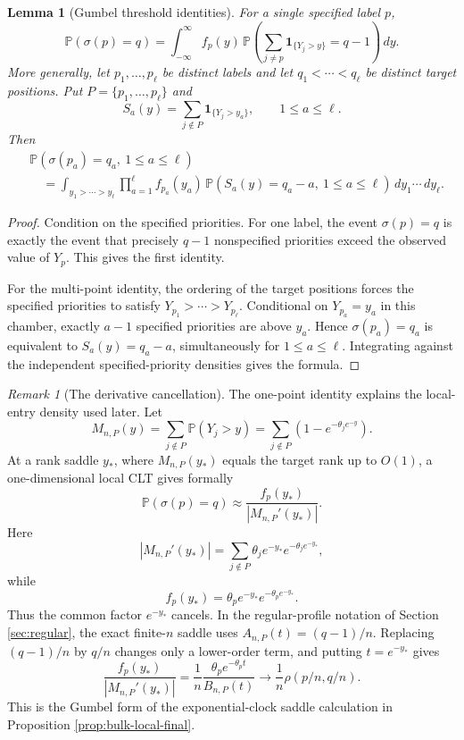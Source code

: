 \documentclass[11pt]{article}
\newtheorem{lemma}[theorem]{Lemma}
\theoremstyle{remark}
\newtheorem{remark}[theorem]{Remark}
\newcommand{\Pp}{\mathbb P}
\newcommand{\one}{\mathbf 1}
\newcommand{\dd}{\,d}
\begin{document}
\begin{lemma}[Gumbel threshold identities]\label{lem:gumbel-threshold-identities}
For a single specified label \(p\),
\[
        \Pp(\sigma(p)=q)
        =\int_{-\infty}^{\infty}
        f_p(y)\,
        \Pp\left(\sum_{j\ne p}\one_{\{Y_j>y\}}=q-1\right)\dd y .
\]
More generally, let \(p_1,\ldots,p_\ell\) be distinct labels and let
\(q_1<\cdots<q_\ell\) be distinct target positions.  Put
\(P=\{p_1,\ldots,p_\ell\}\) and
\[
        S_a(y)=\sum_{j\notin P}\one_{\{Y_j>y_a\}},
        \qquad 1\le a\le\ell .
\]
Then
\[
\begin{aligned}
&\Pp(\sigma(p_a)=q_a,\ 1\le a\le\ell) \\
&\quad=\int_{y_1>\cdots>y_\ell}
        \prod_{a=1}^\ell f_{p_a}(y_a)\,
        \Pp(S_a(y)=q_a-a,\ 1\le a\le\ell)
        \dd y_1\cdots\dd y_\ell .
\end{aligned}
\]
\end{lemma}

\begin{proof}
Condition on the specified priorities.  For one label, the event
\(\sigma(p)=q\) is exactly the event that precisely \(q-1\) nonspecified
priorities exceed the observed value of \(Y_p\).  This gives the first
identity.

For the multi-point identity, the ordering of the target positions forces the
specified priorities to satisfy \(Y_{p_1}>\cdots>Y_{p_\ell}\).  Conditional on
\(Y_{p_a}=y_a\) in this chamber, exactly \(a-1\) specified priorities are above
\(y_a\).  Hence \(\sigma(p_a)=q_a\) is equivalent to
\(S_a(y)=q_a-a\), simultaneously for \(1\le a\le\ell\).  Integrating against the
independent specified-priority densities gives the formula.
\end{proof}

\begin{remark}[The derivative cancellation]\label{rem:gumbel-derivative-cancellation}
The one-point identity explains the local-entry density used later.  Let
\[
        M_{n,P}(y)=\sum_{j\notin P}\Pp(Y_j>y)
        =\sum_{j\notin P}(1-e^{-\theta_j e^{-y}}).
\]
At a rank saddle \(y_*\), where \(M_{n,P}(y_*)\) equals the target rank up to
\(O(1)\), a one-dimensional local CLT gives formally
\[
        \Pp(\sigma(p)=q)
        \approx
        \frac{f_p(y_*)}{|M_{n,P}'(y_*)|}.
\]
Here
\[
        |M_{n,P}'(y_*)|
        =\sum_{j\notin P}\theta_j e^{-y_*}e^{-\theta_j e^{-y_*}},
\]
while
\[
        f_p(y_*)=\theta_p e^{-y_*}e^{-\theta_p e^{-y_*}}.
\]
Thus the common factor \(e^{-y_*}\) cancels.  In the regular-profile notation of
Section \ref{sec:regular}, the exact finite-$n$ saddle uses
$A_{n,P}(t)=(q-1)/n$.  Replacing $(q-1)/n$ by $q/n$ changes only a lower-order
term, and putting \(t=e^{-y_*}\) gives
\[
        \frac{f_p(y_*)}{|M_{n,P}'(y_*)|}
        =\frac1n\frac{\theta_p e^{-\theta_p t}}{B_{n,P}(t)}
        \longrightarrow
        \frac1n\rho(p/n,q/n).
\]
This is the Gumbel form of the exponential-clock saddle calculation in
Proposition \ref{prop:bulk-local-final}.
\end{remark}
\end{document}
